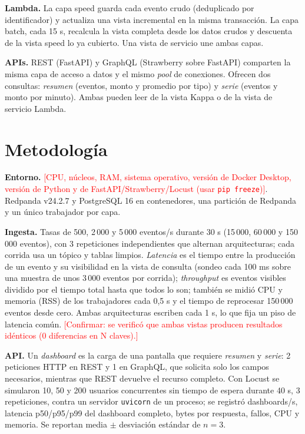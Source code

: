 \documentclass[10pt,a4paper,twocolumn]{article}
\newcommand{\TODO}[1]{\textcolor{red}{[#1]}}
\begin{document}
\textbf{Lambda.} La capa speed guarda cada evento crudo (deduplicado por identificador) y actualiza una vista
incremental en la misma transacción. La capa batch, cada 15 s, recalcula la vista completa desde los datos
crudos y descuenta de la vista speed lo ya cubierto. Una vista de servicio une ambas capas.

\textbf{APIs.} REST (FastAPI) y GraphQL (Strawberry sobre FastAPI) comparten la misma capa de acceso a datos
y el mismo \emph{pool} de conexiones. Ofrecen dos consultas: \emph{resumen} (eventos, monto y promedio por tipo)
y \emph{serie} (eventos y monto por minuto). Ambas pueden leer de la vista Kappa o de la vista de servicio Lambda.

\section{Metodología}
\textbf{Entorno.} \TODO{CPU, núcleos, RAM, sistema operativo, versión de Docker Desktop, versión de Python y
de FastAPI/Strawberry/Locust (usar \texttt{pip freeze})}. Redpanda v24.2.7 y PostgreSQL 16 en contenedores,
una partición de Redpanda y un único trabajador por capa.

\textbf{Ingesta.} Tasas de 500, 2\,000 y 5\,000 eventos/s durante 30 s (15\,000, 60\,000 y 150\,000 eventos),
con 3 repeticiones independientes que alternan arquitecturas; cada corrida usa un tópico y tablas limpios.
\emph{Latencia} es el tiempo entre la producción de un evento y su visibilidad en la vista de consulta
(sondeo cada 100 ms sobre una muestra de unos 3\,000 eventos por corrida); \emph{throughput} es eventos
visibles dividido por el tiempo total hasta que todos lo son; también se midió CPU y memoria (RSS) de los
trabajadores cada 0,5 s y el tiempo de reprocesar 150\,000 eventos desde cero. Ambas arquitecturas escriben
cada 1 s, lo que fija un piso de latencia común. \TODO{Confirmar: se verificó que ambas vistas producen
resultados idénticos (0 diferencias en N claves).}

\textbf{API.} Un \emph{dashboard} es la carga de una pantalla que requiere \emph{resumen} y \emph{serie}:
2 peticiones HTTP en REST y 1 en GraphQL, que solicita solo los campos necesarios, mientras que REST devuelve
el recurso completo. Con Locust se simularon 10, 50 y 200 usuarios concurrentes sin tiempo de espera durante
40 s, 3 repeticiones, contra un servidor \texttt{uvicorn} de un proceso; se registró dashboards/s, latencia
p50/p95/p99 del dashboard completo, bytes por respuesta, fallos, CPU y memoria. Se reportan media $\pm$
desviación estándar de $n=3$.
\end{document}
